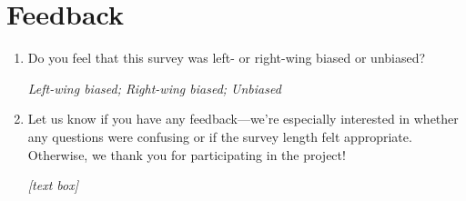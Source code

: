 \documentclass[11pt, headsepline]{article}
\begin{document}
\section*{Feedback}

\begin{enumerate}[resume]





    \item Do you feel that this survey was left- or right-wing biased or unbiased?

    \textit{Left-wing biased; Right-wing biased; Unbiased}

    \item Let us know if you have any feedback—we're especially interested in whether any questions were confusing or if the survey length felt appropriate. Otherwise, we thank you for participating in the project!

    \textit{[text box]}
    
\end{enumerate}





    
\end{document}
